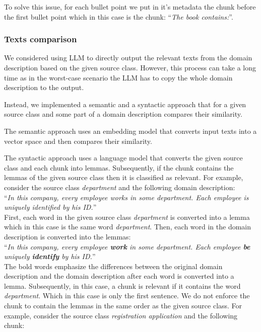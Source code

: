 \noindent{}To solve this issue, for each bullet point we put in it's metadata the chunk before the first bullet point which in this case is the chunk: ``\textit{The book contains:}''.



\subsubsection{Texts comparison}
\label{texts_comparison}
  
We considered using LLM to directly output the relevant texts from the domain description based on the given source class. However, this process can take a long time as in the worst-case scenario the LLM has to copy the whole domain description to the output.

Instead, we implemented a semantic and a syntactic approach that for a given source class and some part of a domain description compares their similarity.
 
The semantic approach uses an embedding model that converts input texts into a vector space and then compares their similarity.

The syntactic approach uses a language model that converts the given source class and each chunk into lemmas. Subsequently, if the chunk contains the lemmas of the given source class then it is classified as relevant. For example, consider the source class \textit{department} and the following domain description: \\

``\textit{In this company, every employee works in some department. Each employee is uniquely identified by his ID.}'' \\

First, each word in the given source class \textit{department} is converted into a lemma which in this case is the same word \textit{department}. Then, each word in the domain description is converted into the lemmas: \\

``\textit{In this company, every employee \textbf{work} in some department. Each employee \textbf{be} uniquely \textbf{identify} by his ID.}'' \\

The bold words emphasize the differences between the original domain description and the domain description after each word is converted into a lemma. Subsequently, in this case, a chunk is relevant if it contains the word \textit{department}. Which in this case is only the first sentence. We do not enforce the chunk to contain the lemmas in the same order as the given source class. For example, consider the source class \textit{registration application} and the following chunk: \\

